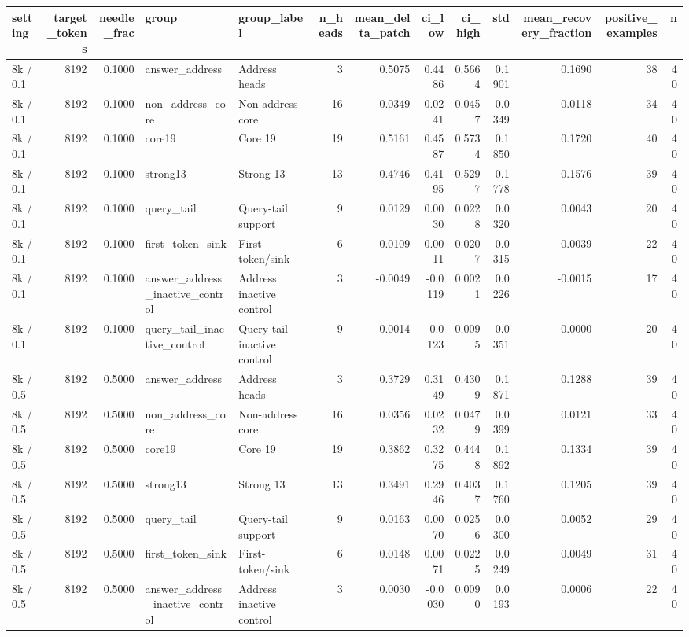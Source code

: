 \begin{tabular}{lrrllrrrrrrrr}
\toprule
setting & target_tokens & needle_frac & group & group_label & n_heads & mean_delta_patch & ci_low & ci_high & std & mean_recovery_fraction & positive_examples & n \\
\midrule
8k / 0.1 & 8192 & 0.1000 & answer_address & Address heads & 3 & 0.5075 & 0.4486 & 0.5664 & 0.1901 & 0.1690 & 38 & 40 \\
8k / 0.1 & 8192 & 0.1000 & non_address_core & Non-address core & 16 & 0.0349 & 0.0241 & 0.0457 & 0.0349 & 0.0118 & 34 & 40 \\
8k / 0.1 & 8192 & 0.1000 & core19 & Core 19 & 19 & 0.5161 & 0.4587 & 0.5734 & 0.1850 & 0.1720 & 40 & 40 \\
8k / 0.1 & 8192 & 0.1000 & strong13 & Strong 13 & 13 & 0.4746 & 0.4195 & 0.5297 & 0.1778 & 0.1576 & 39 & 40 \\
8k / 0.1 & 8192 & 0.1000 & query_tail & Query-tail support & 9 & 0.0129 & 0.0030 & 0.0228 & 0.0320 & 0.0043 & 20 & 40 \\
8k / 0.1 & 8192 & 0.1000 & first_token_sink & First-token/sink & 6 & 0.0109 & 0.0011 & 0.0207 & 0.0315 & 0.0039 & 22 & 40 \\
8k / 0.1 & 8192 & 0.1000 & answer_address_inactive_control & Address inactive control & 3 & -0.0049 & -0.0119 & 0.0021 & 0.0226 & -0.0015 & 17 & 40 \\
8k / 0.1 & 8192 & 0.1000 & query_tail_inactive_control & Query-tail inactive control & 9 & -0.0014 & -0.0123 & 0.0095 & 0.0351 & -0.0000 & 20 & 40 \\
8k / 0.5 & 8192 & 0.5000 & answer_address & Address heads & 3 & 0.3729 & 0.3149 & 0.4309 & 0.1871 & 0.1288 & 39 & 40 \\
8k / 0.5 & 8192 & 0.5000 & non_address_core & Non-address core & 16 & 0.0356 & 0.0232 & 0.0479 & 0.0399 & 0.0121 & 33 & 40 \\
8k / 0.5 & 8192 & 0.5000 & core19 & Core 19 & 19 & 0.3862 & 0.3275 & 0.4448 & 0.1892 & 0.1334 & 39 & 40 \\
8k / 0.5 & 8192 & 0.5000 & strong13 & Strong 13 & 13 & 0.3491 & 0.2946 & 0.4037 & 0.1760 & 0.1205 & 39 & 40 \\
8k / 0.5 & 8192 & 0.5000 & query_tail & Query-tail support & 9 & 0.0163 & 0.0070 & 0.0256 & 0.0300 & 0.0052 & 29 & 40 \\
8k / 0.5 & 8192 & 0.5000 & first_token_sink & First-token/sink & 6 & 0.0148 & 0.0071 & 0.0225 & 0.0249 & 0.0049 & 31 & 40 \\
8k / 0.5 & 8192 & 0.5000 & answer_address_inactive_control & Address inactive control & 3 & 0.0030 & -0.0030 & 0.0090 & 0.0193 & 0.0006 & 22 & 40 \\

\end{tabular}
